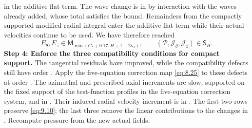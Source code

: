  in the additive flat term. The wave change is in
 by interaction with the waves already added, whose total satisfies the
 bound. Remainders from the compactly supported modified radial
integral enter the additive flat term while their actual velocities continue to be used. We have
therefore reached
\[
E_\theta,E_z\in \mathsf M_{\min(C_*+0.17,H+1-2\kappa_s)},
\qquad
(\mathcal P,\mathcal J_\theta,\mathcal J_z)\in \mathsf S_H.
\]
%
\noindent\textbf{Step 4: Enforce the three compatibility conditions for compact support.} The
tangential residuals have improved, while the compatibility defects still have order
. Apply the five-equation correction map \eqref{eq:8.25} to these defects
at order . The azimuthal and prescribed axial increments are slow,
supported on the fixed support of the test-function profiles in the five-equation correction system,
and in . Their induced radial velocity increment is in
. The first two rows preserve \eqref{eq:9.10}; the last three remove
the linear contributions to the changes in
. Recompute pressure from the new
actual fields.

